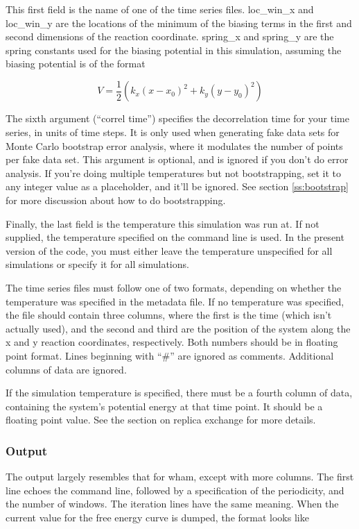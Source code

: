 \documentclass[12pt]{article}
\begin{document}
This first field is the name of one of the time series files.  loc\_win\_x
and loc\_win\_y are the locations of the minimum of the biasing terms in the
first and second dimensions of the reaction coordinate.  spring\_x and
spring\_y are the spring constants used for the biasing potential in this
simulation, assuming the biasing potential is of the format

\begin{equation}
V = \frac{1}{2} ( k_x (x - x_0)^2 + k_y (y -y_0)^2 )
\end{equation}

The sixth argument (``correl time'') specifies the decorrelation time for
your time series, in units of time steps.  It is only used when generating
fake data sets for Monte Carlo bootstrap error analysis, where it modulates
the number of points per fake data set.  This argument is optional, and is
ignored if you don't do error analysis.  If you're doing multiple
temperatures but not bootstrapping, set it to any integer value as a
placeholder, and it'll be ignored.  See section \ref{ss:bootstrap} for more
discussion about how to do bootstrapping.

Finally, the last field is the temperature this simulation was run at.  If
not supplied, the temperature specified on the command line is used.  In
the present version of the code, you must either leave the temperature
unspecified for all simulations or specify it for all simulations.

The time series files must follow one of two formats, depending on whether
the temperature was specified in the metadata file.  If no temperature was
specified, the file should contain three columns, where the first is the
time (which isn't actually used), and the second and third are the position
of the system along the x and y reaction coordinates, respectively.  Both
numbers should be in floating point format.  Lines beginning with ``\#'' are
ignored as comments.  Additional columns of data are ignored.

If the simulation temperature is specified, there must be a fourth column of
data, containing the system's potential energy at that time point.  It
should be a floating point value.  See the section on replica exchange for
more details.

\subsubsection{Output}

The output largely resembles that for wham, except with more columns.  The first
line echoes the command line, followed by a specification of the periodicity,
and the number of windows.  The iteration lines have the same meaning.  When the
current value for the free energy curve is dumped, the format looks like
\end{document}
